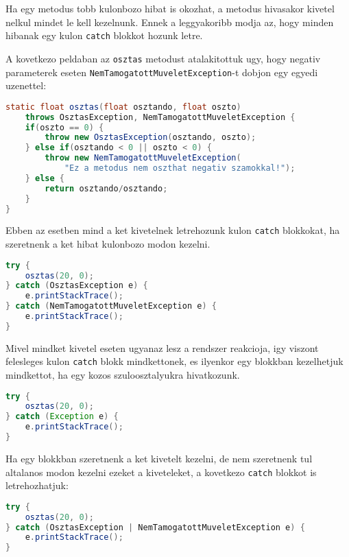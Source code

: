 \documentclass{article}
\let\l\lstinline
\begin{document}
Ha egy metodus tobb kulonbozo hibat is okozhat, a metodus hivasakor kivetel nelkul mindet le kell kezelnunk. Ennek a leggyakoribb modja az, hogy minden hibanak egy kulon \l{catch} blokkot hozunk letre.

A kovetkezo peldaban az \l{osztas} metodust atalakitottuk ugy, hogy negativ parameterek eseten \l{NemTamogatottMuveletException}-t dobjon egy egyedi uzenettel:
\begin{lstlisting}[language=Java, caption=Metodus ami tobb kivetelt okozhat]
static float osztas(float osztando, float oszto)
    throws OsztasException, NemTamogatottMuveletException {
    if(oszto == 0) {
        throw new OsztasException(osztando, oszto);
    } else if(osztando < 0 || oszto < 0) {
        throw new NemTamogatottMuveletException(
            "Ez a metodus nem oszthat negativ szamokkal!");
    } else {
        return osztando/osztando;
    }
}
\end{lstlisting}

Ebben az esetben mind a ket kivetelnek letrehozunk kulon \l{catch} blokkokat, ha szeretnenk a ket hibat kulonbozo modon kezelni.

\begin{lstlisting}[language=Java, caption=Osztas metodus kiveteleinek kezelese kulon]
try {
    osztas(20, 0);
} catch (OsztasException e) {
    e.printStackTrace();
} catch (NemTamogatottMuveletException e) {
    e.printStackTrace();
}
\end{lstlisting}

Mivel mindket kivetel eseten ugyanaz lesz a rendszer reakcioja, igy viszont felesleges kulon \l{catch} blokk mindkettonek, es ilyenkor egy blokkban kezelhetjuk mindkettot, ha egy kozos szuloosztalyukra hivatkozunk.

\begin{lstlisting}[language=Java, caption=Osztas metodus kiveteleinek kezelese egyutt]
try {
    osztas(20, 0);
} catch (Exception e) {
    e.printStackTrace();
}
\end{lstlisting}

Ha egy blokkban szeretnenk a ket kivetelt kezelni, de nem szeretnenk tul altalanos modon kezelni ezeket a kiveteleket, a kovetkezo \l{catch} blokkot is letrehozhatjuk:

\begin{lstlisting}[language=Java, caption=Osztas metodus kiveteleinek kezelese egyutt]
try {
    osztas(20, 0);
} catch (OsztasException | NemTamogatottMuveletException e) {
    e.printStackTrace();
}
\end{lstlisting}
\end{document}

